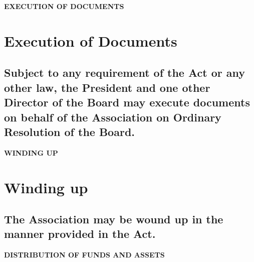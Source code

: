 \documentclass{article}
\newenvironment{subs}
  {\adjustwidth{2em}{0pt}}
  {\endadjustwidth}
\begin{document}
\vspace{5mm}
{\large\bf EXECUTION OF DOCUMENTS\par}
\hrulefill
\vspace{5mm}

\section{Execution of Documents}
\begin{subs}
\subsection{Subject to any requirement of the Act or any other law, the President and one other Director of the Board may execute documents on behalf of the Association on Ordinary Resolution of the Board.}
\end{subs}

{\large\bf WINDING UP\par}
\hrulefill
\vspace{5mm}

\section{Winding up}
\begin{subs}
\subsection{The Association may be wound up in the manner provided in the Act.}
\end{subs}

\vspace{5mm}
{\large\bf DISTRIBUTION OF FUNDS AND ASSETS\par}
\hrulefill
\vspace{5mm}
\end{document}
